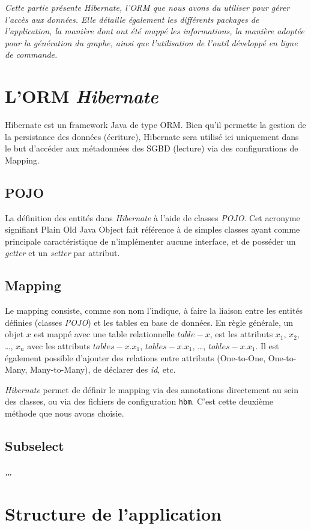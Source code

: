 \textit{Cette partie présente \emph{Hibernate}, l'ORM que nous avons du utiliser pour gérer l'accès aux données. Elle détaille également les différents packages de l'application, la manière dont ont été mappé les informations, la manière adoptée pour la génération du graphe, ainsi que l'utilisation de l'outil développé en ligne de commande.}

\section{L'ORM \emph{Hibernate}}
Hibernate est un framework Java de type ORM. Bien qu'il permette la gestion de la persistance des données (écriture), Hibernate sera utilisé ici uniquement dans le but d'accéder aux métadonnées des SGBD (lecture) via des configurations de Mapping.
\subsection{POJO}
La définition des entités dans \emph{Hibernate} à l'aide de classes \emph{POJO}. Cet acronyme signifiant \og Plain Old Java Object \fg{} fait référence à de simples classes ayant comme principale caractéristique de n'implémenter aucune interface, et de posséder un \emph{getter} et un \emph{setter} par attribut.
\subsection{Mapping}
Le mapping consiste, comme son nom l'indique, à faire la liaison entre les entités définies (classes \emph{POJO}) et les tables en base de données. En règle générale, un objet $x$ est mappé avec une table relationnelle $table-x$, est les attributs $x_1$, $x_2$, \ldots, $x_n$ avec les attributs $tables-x.x_1$, $tables-x.x_1$, \ldots, $tables-x.x_1$. Il est également possible d'ajouter des relations entre attributs (One-to-One, One-to-Many, Many-to-Many), de déclarer des \emph{id}, etc.

\emph{Hibernate} permet de définir le mapping via des annotations directement au sein des classes, ou via des fichiers de configuration \texttt{hbm}. C'est cette deuxième méthode que nous avons choisie.
\subsection{Subselect}
\subparagraph{\ldots}

\section{Structure de l'application}

